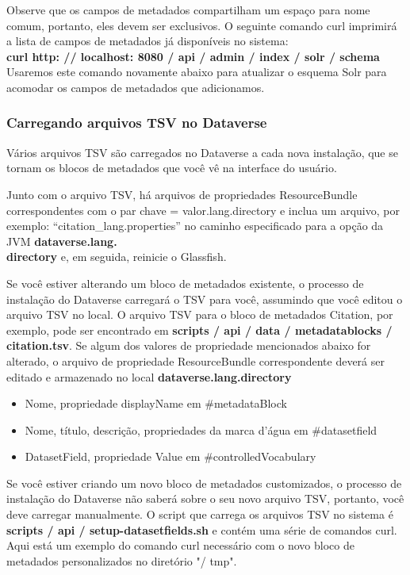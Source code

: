 \documentclass[12pt,hidelinks]{article}
\begin{document}
\qquad Observe que os campos de metadados compartilham um espaço para nome comum, portanto, eles devem ser exclusivos. O seguinte comando curl imprimirá a lista de campos de metadados já disponíveis no sistema:\\

\textbf{curl http: // localhost: 8080 / api / admin / index / solr / schema}\\

Usaremos este comando novamente abaixo para atualizar o esquema Solr para acomodar os campos de metadados que adicionamos.

\subsubsection{Carregando arquivos TSV no Dataverse}

\qquad Vários arquivos TSV são carregados no Dataverse a cada nova instalação, que se tornam os blocos de metadados que você vê na interface do usuário.

Junto com o arquivo TSV, há arquivos de propriedades ResourceBundle correspondentes com o par chave = valor.lang.directory e inclua um arquivo, por exemplo: “citation\_lang.properties” no caminho especificado para a opção da JVM 
\textbf{dataverse.lang.\\directory} e, em seguida, reinicie o Glassfish.

Se você estiver alterando um bloco de metadados existente, o processo de instalação do Dataverse carregará o TSV para você, assumindo que você editou o arquivo TSV no local. O arquivo TSV para o bloco de metadados Citation, por exemplo, pode ser encontrado em  \textbf{scripts / api / data / metadatablocks / citation.tsv}. Se algum dos valores de propriedade mencionados abaixo for alterado, o arquivo de propriedade ResourceBundle correspondente deverá ser editado e armazenado no local \textbf{dataverse.lang.directory}

\begin{itemize}
    
\item Nome, propriedade displayName em \#metadataBlock
\item Nome, título, descrição, propriedades da marca d'água em \#datasetfield
\item DatasetField, propriedade Value em \#controlledVocabulary

\end{itemize}

Se você estiver criando um novo bloco de metadados customizados, o processo de instalação do Dataverse não saberá sobre o seu novo arquivo TSV, portanto, você deve carregar manualmente. O script que carrega os arquivos TSV no sistema é \textbf{scripts / api / setup-datasetfields.sh} e contém uma série de comandos curl. Aqui está um exemplo do comando curl necessário com o novo bloco de metadados personalizados no diretório "/ tmp".
\end{document}
